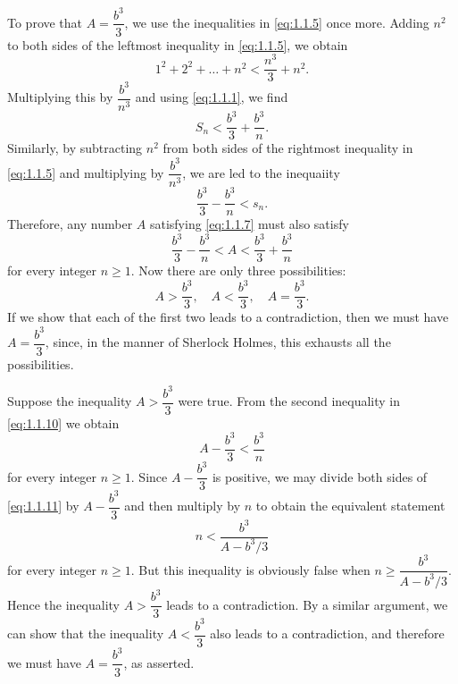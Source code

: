 \begin{note}
  To prove that \(A = \dfrac{b^3}{3}\), we use the inequalities in \cref{eq:1.1.5} once more.
  Adding \(n^2\) to both sides of the leftmost inequality in \cref{eq:1.1.5}, we obtain
  \[
    1^2 + 2^2 + \dots + n^2 < \dfrac{n^3}{3} + n^2.
  \]
  Multiplying this by \(\dfrac{b^3}{n^3}\) and using \cref{eq:1.1.1}, we find
  \begin{equation}\label{eq:1.1.8}
    S_n < \dfrac{b^3}{3} + \dfrac{b^3}{n}.
  \end{equation}
  Similarly, by subtracting \(n^2\) from both sides of the rightmost inequality in \cref{eq:1.1.5} and multiplying by \(\dfrac{b^3}{n^3}\), we are led to the inequaiity
  \begin{equation}\label{eq:1.1.9}
    \dfrac{b^3}{3} - \dfrac{b^3}{n} < s_n.
  \end{equation}
  Therefore, any number \(A\) satisfying \cref{eq:1.1.7} must also satisfy
  \begin{equation}\label{eq:1.1.10}
    \dfrac{b^3}{3} - \dfrac{b^3}{n} < A < \dfrac{b^3}{3} + \dfrac{b^3}{n}
  \end{equation}
  for every integer \(n \geq 1\).
  Now there are only three possibilities:
  \[
    A > \dfrac{b^3}{3}, \quad A < \dfrac{b^3}{3}, \quad A = \dfrac{b^3}{3}.
  \]
  If we show that each of the first two leads to a contradiction, then we must have \(A = \dfrac{b^3}{3}\), since, in the manner of Sherlock Holmes, this exhausts all the possibilities.

  Suppose the inequality \(A > \dfrac{b^3}{3}\) were true.
  From the second inequality in \cref{eq:1.1.10} we obtain
  \begin{equation}\label{eq:1.1.11}
    A - \dfrac{b^3}{3} < \dfrac{b^3}{n}
  \end{equation}
  for every integer \(n \geq 1\).
  Since \(A - \dfrac{b^3}{3}\) is positive, we may divide both sides of \cref{eq:1.1.11} by \(A - \dfrac{b^3}{3}\) and then multiply by \(n\) to obtain the equivalent statement
  \[
    n < \dfrac{b^3}{A - b^3 / 3}
  \]
  for every integer \(n \geq 1\).
  But this inequality is obviously false when \(n \geq \dfrac{b^3}{A - b^3 / 3}\).
  Hence the inequality \(A > \dfrac{b^3}{3}\) leads to a contradiction.
  By a similar argument, we can show that the inequality \(A < \dfrac{b^3}{3}\) also leads to a contradiction, and therefore we must have \(A = \dfrac{b^3}{3}\), as asserted.
\end{note}
